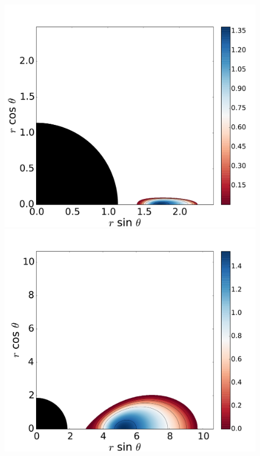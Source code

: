 \documentclass{aa}
\begin{document}
\begin{figure}
\includegraphics[scale=0.16]{figures/fig2_3_3.pdf}
\\
\includegraphics[scale=0.16]{figures/fig2_4_1.pdf}
\hspace{-0.3cm}

\end{figure}
\end{document}
